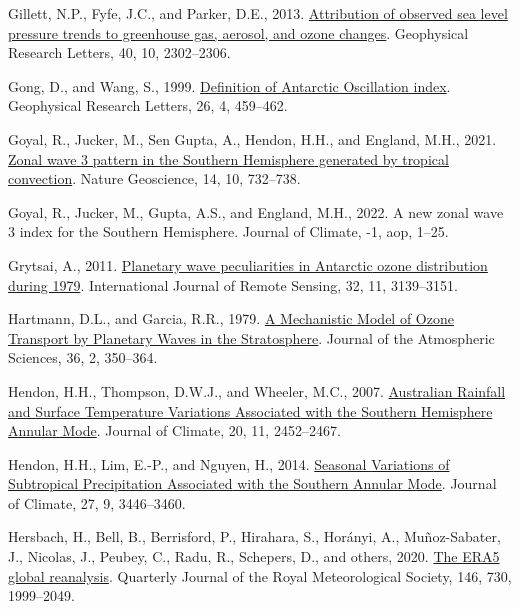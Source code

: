 \documentclass[12pt,oneside]{reedthesis}
\newlength{\cslhangindent}
\newenvironment{CSLReferences}[2] %
 {%
  \setlength{\parindent}{0pt}
  \ifodd #1 \everypar{\setlength{\hangindent}{\cslhangindent}}\ignorespaces\fi
  \ifnum #2 > 0
  \setlength{\parskip}{#2\baselineskip}
  \fi
 }%
 {}
\begin{document}
\begin{CSLReferences}{1}{0}
\leavevmode{}%
Gillett, N.P., Fyfe, J.C., and Parker, D.E., 2013. \href{https://doi.org/10.1002/grl.50500}{Attribution of observed sea level pressure trends to greenhouse gas, aerosol, and ozone changes}. Geophysical Research Letters, 40, 10, 2302--2306.

\leavevmode{}%
Gong, D., and Wang, S., 1999. \href{https://doi.org/10.1029/1999GL900003}{Definition of {Antarctic Oscillation} index}. Geophysical Research Letters, 26, 4, 459--462.

\leavevmode{}%
Goyal, R., Jucker, M., Sen Gupta, A., Hendon, H.H., and England, M.H., 2021. \href{https://doi.org/10.1038/s41561-021-00811-3}{Zonal wave 3 pattern in the {Southern Hemisphere} generated by tropical convection}. Nature Geoscience, 14, 10, 732--738.

\leavevmode{}%
Goyal, R., Jucker, M., Gupta, A.S., and England, M.H., 2022. A new zonal wave 3 index for the {Southern Hemisphere}. Journal of Climate, -1, aop, 1--25.

\leavevmode{}%
Grytsai, A., 2011. \href{https://doi.org/10.1080/01431161.2010.541518}{Planetary wave peculiarities in {Antarctic} ozone distribution during 1979}. International Journal of Remote Sensing, 32, 11, 3139--3151.

\leavevmode{}%
Hartmann, D.L., and Garcia, R.R., 1979. \href{https://doi.org/10.1175/1520-0469(1979)036\%3C0350:AMMOOT\%3E2.0.CO;2}{A {Mechanistic Model} of {Ozone Transport} by {Planetary Waves} in the {Stratosphere}}. Journal of the Atmospheric Sciences, 36, 2, 350--364.

\leavevmode{}%
Hendon, H.H., Thompson, D.W.J., and Wheeler, M.C., 2007. \href{https://doi.org/10.1175/JCLI4134.1}{Australian {Rainfall} and {Surface Temperature Variations Associated} with the {Southern Hemisphere Annular Mode}}. Journal of Climate, 20, 11, 2452--2467.

\leavevmode{}%
Hendon, H.H., Lim, E.-P., and Nguyen, H., 2014. \href{https://doi.org/10.1175/JCLI-D-13-00550.1}{Seasonal {Variations} of {Subtropical Precipitation Associated} with the {Southern Annular Mode}}. Journal of Climate, 27, 9, 3446--3460.

\leavevmode{}%
Hersbach, H., Bell, B., Berrisford, P., Hirahara, S., Horányi, A., Muñoz-Sabater, J., Nicolas, J., Peubey, C., Radu, R., Schepers, D., and others, 2020. \href{https://doi.org/10.1002/qj.3803}{The {ERA5} global reanalysis}. Quarterly Journal of the Royal Meteorological Society, 146, 730, 1999--2049.


\end{CSLReferences}
\end{document}
